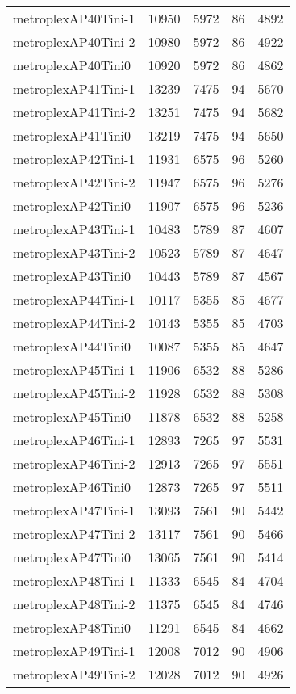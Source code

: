 \documentclass[../../../thesis.tex]{subfiles}
\begin{document}
\begin{longtable}{lrrrr}
metroplexAP40Tini-1 & 10950 & 5972 & 86 & 4892 \\
metroplexAP40Tini-2 & 10980 & 5972 & 86 & 4922 \\
metroplexAP40Tini0 & 10920 & 5972 & 86 & 4862 \\
metroplexAP41Tini-1 & 13239 & 7475 & 94 & 5670 \\
metroplexAP41Tini-2 & 13251 & 7475 & 94 & 5682 \\
metroplexAP41Tini0 & 13219 & 7475 & 94 & 5650 \\
metroplexAP42Tini-1 & 11931 & 6575 & 96 & 5260 \\
metroplexAP42Tini-2 & 11947 & 6575 & 96 & 5276 \\
metroplexAP42Tini0 & 11907 & 6575 & 96 & 5236 \\
metroplexAP43Tini-1 & 10483 & 5789 & 87 & 4607 \\
metroplexAP43Tini-2 & 10523 & 5789 & 87 & 4647 \\
metroplexAP43Tini0 & 10443 & 5789 & 87 & 4567 \\
metroplexAP44Tini-1 & 10117 & 5355 & 85 & 4677 \\
metroplexAP44Tini-2 & 10143 & 5355 & 85 & 4703 \\
metroplexAP44Tini0 & 10087 & 5355 & 85 & 4647 \\
metroplexAP45Tini-1 & 11906 & 6532 & 88 & 5286 \\
metroplexAP45Tini-2 & 11928 & 6532 & 88 & 5308 \\
metroplexAP45Tini0 & 11878 & 6532 & 88 & 5258 \\
metroplexAP46Tini-1 & 12893 & 7265 & 97 & 5531 \\
metroplexAP46Tini-2 & 12913 & 7265 & 97 & 5551 \\
metroplexAP46Tini0 & 12873 & 7265 & 97 & 5511 \\
metroplexAP47Tini-1 & 13093 & 7561 & 90 & 5442 \\
metroplexAP47Tini-2 & 13117 & 7561 & 90 & 5466 \\
metroplexAP47Tini0 & 13065 & 7561 & 90 & 5414 \\
metroplexAP48Tini-1 & 11333 & 6545 & 84 & 4704 \\
metroplexAP48Tini-2 & 11375 & 6545 & 84 & 4746 \\
metroplexAP48Tini0 & 11291 & 6545 & 84 & 4662 \\
metroplexAP49Tini-1 & 12008 & 7012 & 90 & 4906 \\
metroplexAP49Tini-2 & 12028 & 7012 & 90 & 4926 \\

\end{longtable}
\end{document}
